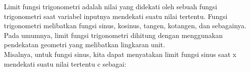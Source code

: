 \documentclass[a4paper,10pt]{article}
\begin{document}
\begin{eulernotebook}
\begin{eulercomment}
\begin{eulercomment}
\begin{eulercomment}
\begin{eulercomment}
\begin{eulercomment}
\begin{eulercomment}
\begin{eulercomment}
\begin{eulercomment}
\begin{eulercomment}
\begin{eulercomment}
Limit fungsi trigonometri adalah nilai yang didekati oleh sebuah
fungsi trigonometri saat variabel inputnya mendekati suatu nilai
tertentu. Fungsi trigonometri melibatkan fungsi sinus, kosinus,
tangen, kotangen, dan sebagainya. Pada umumnya, limit fungsi
trigonometri dihitung dengan menggunakan pendekatan geometri yang
melibatkan lingkaran unit.\\
Misalnya, untuk fungsi sinus, kita dapat menyatakan limit fungsi sinus
saat x mendekati suatu nilai tertentu c sebagai:


\end{eulercomment}
\end{eulercomment}
\end{eulercomment}
\end{eulercomment}
\end{eulercomment}
\end{eulercomment}
\end{eulercomment}
\end{eulercomment}
\end{eulercomment}
\end{eulercomment}
\end{eulernotebook}
\end{document}
